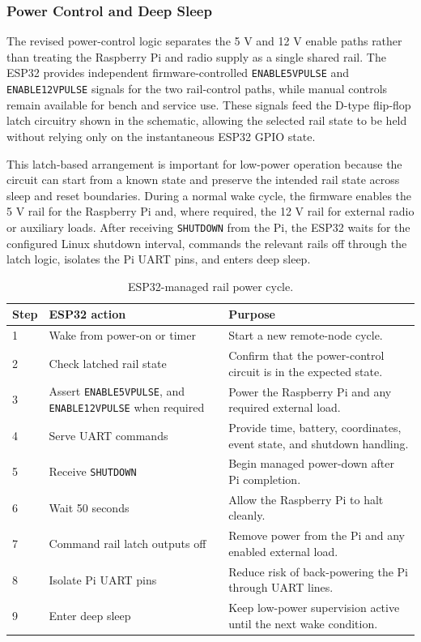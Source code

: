 \documentclass[acmsmall,screen]{acmart}
\begin{document}
\subsubsection{Power Control and Deep Sleep}
The revised power-control logic separates the 5 V and 12 V enable paths rather than treating the Raspberry Pi and radio supply as a single shared rail. The ESP32 provides independent firmware-controlled \texttt{ENABLE5VPULSE} and \texttt{ENABLE12VPULSE} signals for the two rail-control paths, while manual controls remain available for bench and service use. These signals feed the D-type flip-flop latch circuitry shown in the schematic, allowing the selected rail state to be held without relying only on the instantaneous ESP32 GPIO state.

This latch-based arrangement is important for low-power operation because the circuit can start from a known state and preserve the intended rail state across sleep and reset boundaries. During a normal wake cycle, the firmware enables the 5 V rail for the Raspberry Pi and, where required, the 12 V rail for external radio or auxiliary loads. After receiving \texttt{SHUTDOWN} from the Pi, the ESP32 waits for the configured Linux shutdown interval, commands the relevant rails off through the latch logic, isolates the Pi UART pins, and enters deep sleep.

\begin{table}[tbp]
\centering
\caption{ESP32-managed rail power cycle.}
\label{tab:esp32-power-cycle}
\begin{tabularx}{\textwidth}{p{}p{}X}
\toprule
Step & ESP32 action & Purpose \\
\midrule
1 & Wake from power-on or timer & Start a new remote-node cycle. \\
2 & Check latched rail state & Confirm that the power-control circuit is in the expected state. \\
3 & Assert \texttt{ENABLE5VPULSE}, and \texttt{ENABLE12VPULSE} when required & Power the Raspberry Pi and any required external load. \\
4 & Serve UART commands & Provide time, battery, coordinates, event state, and shutdown handling. \\
5 & Receive \texttt{SHUTDOWN} & Begin managed power-down after Pi completion. \\
6 & Wait 50 seconds & Allow the Raspberry Pi to halt cleanly. \\
7 & Command rail latch outputs off & Remove power from the Pi and any enabled external load. \\
8 & Isolate Pi UART pins & Reduce risk of back-powering the Pi through UART lines. \\
9 & Enter deep sleep & Keep low-power supervision active until the next wake condition. \\
\bottomrule
\end{tabularx}
\end{table}
\end{document}
